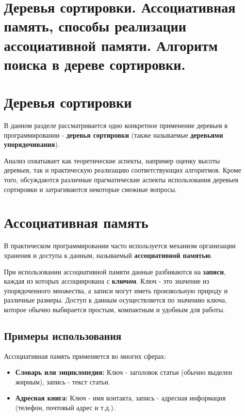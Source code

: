 {
	\section{Деревья сортировки. Ассоциативная память, способы реализации ассоциативной
памяти. Алгоритм поиска в дереве сортировки.}

\section*{Деревья сортировки}

В данном разделе рассматривается одно конкретное применение деревьев в программировании - \textbf{деревья сортировки} (также называемые \textbf{деревьями упорядочивания}).

Анализ охватывает как теоретические аспекты, например оценку высоты деревьев, так и практическую реализацию соответствующих алгоритмов.  
Кроме того, обсуждаются различные прагматические аспекты использования деревьев сортировки и затрагиваются некоторые смежные вопросы.

\section*{Ассоциативная память}

В практическом программировании часто используется механизм организации хранения и доступа к данным, называемый \textbf{ассоциативной памятью}.

При использовании ассоциативной памяти данные разбиваются на \textbf{записи}, каждая из которых ассоциирована с \textbf{ключом}.  
Ключ - это значение из упорядоченного множества, а записи могут иметь произвольную природу и различные размеры.  
Доступ к данным осуществляется по значению ключа, которое обычно выбирается простым, компактным и удобным для работы.

\subsection*{Примеры использования}

Ассоциативная память применяется во многих сферах:

\begin{itemize}
  \item \textbf{Словарь или энциклопедия:}  
  Ключ - заголовок статьи (обычно выделен жирным), запись - текст статьи.

  \item \textbf{Адресная книга:}  
  Ключ - имя контакта, запись - адресная информация (телефон, почтовый адрес и т.д.).


\end{itemize}}
